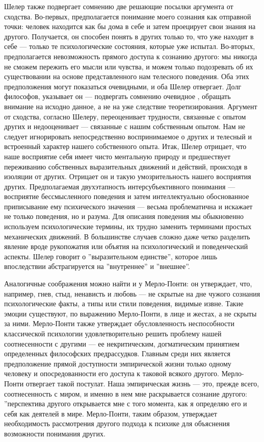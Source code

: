 \documentclass[11pt]{book}
\begin{document}
Шелер также подвергает сомнению две решающие посылки аргумента от сходства. Во-первых, предполагается понимание моего сознания как отправной точки: человек находится как бы дома в себе и затем проецирует свои знания на другого. Получается, он способен понять в других только то, что уже находит в себе --- только те психологические состояния, которые уже испытал. Во-вторых, предполагается невозможность прямого доступа к сознанию другого: мы никогда не сможем пережить его мысли или чувства, и можем только подозревать об их существовании на основе представленного нам телесного поведения. Оба этих предположения могут показаться очевидными, и оба Шелер отвергает. Долг философов, указывает он --- подвергать сомнению очевидное , обращать внимание на исходно данное, а не на уже следствие теоретизирования. Аргумент от сходства, согласно Шелеру, переоценивает трудности, связанные с опытом других и недооценивает --- связанные с нашим собственным опытом. Нам не следует игнорировать непосредственно воспринимаемое о других и телесный и встроенный характер нашего собственного опыта. Итак, Шелер отрицает, что наше восприятие себя имеет чисто ментальную природу и предшествует переживанию собственных выразительных движений и действий, происходя в изоляции от других. Отрицает он и такую умозрительность нашего восприятия других. Предполагаемая двухэтапность интерсубъективного понимания --- восприятие бессмысленного поведения и затем интеллектуально обоснованное приписывание ему психического значения --- весьма проблематична и искажает не только поведения, но и разума. Для описания поведения мы обыкновенно используем психологические термины, их трудно заменить терминами простых механических движений. В большинстве случаев сложно даже четко разделить явление вроде рукопожатия или объятия на психологический и поведенческий аспекты. Шелер говорит о ''выразительном единстве'', которое лишь впоследствии абстрагируется на ''внутреннее'' и ''внешнее''.

Аналогичные соображения можно найти и у Мерло-Понти: он утверждает, что, например, гнев, стыд, ненависть и любовь --- не скрытые на дне чужого сознания психологические факты, а типы или стили поведения, видимые извне. Такие эмоции существуют, по выражению Мерло-Понти, в лице и жестах, а не скрыты за ними. Мерло-Понти также утверждает обусловленность неспособности классической психологии удовлетворительно решить проблему нашей соотнесенности с другими --- ее некритическим, догматическим принятием определенных философских предрассудков. Главным среди них является предположение прямой доступности эмпирической жизни только одному человеку и опосредованности его доступа к таковой всякого другого. Мерло-Понти отвергает такой постулат. Наша эмпирическая жизнь --- это, прежде всего, соотнесенность с миром, и именно в нем мне раскрывается сознание другого: ''перспектива другого открывается мне с того момента, как я определяю его и себя как деятелей в мире. Мерло-Понти, таким образом, утверждает необходимость рассмотрения другого подхода к психике для объяснения возможности понимания других.
\end{document}
